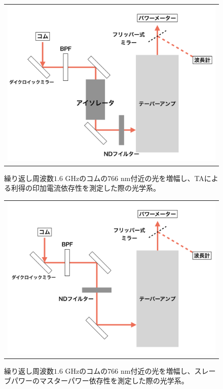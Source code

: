 \documentclass[uplatex, dvipdfmx, a4paper, report, papersize, 11pt]{jsbook}
\begin{document}
\begin{figure}[H]
  \centering
    \begin{tabular}{c}
      \begin{minipage}{1\hsize}
        \centering
          \includegraphics[keepaspectratio,  scale=0.35,  angle=0]
          {figures/chapter4/astro_amp_diagram_isolator.png}
          \caption{繰り返し周波数$1.6$ GHzのコムの$766$ nm付近の光を増幅し、TAによる利得の印加電流依存性を測定した際の光学系。}
          \label{astro_amp_diagram_isolator}
      \end{minipage}
    \end{tabular}
\end{figure}
\begin{figure}[H]
  \centering
    \begin{tabular}{c}
      \begin{minipage}{1\hsize}
        \centering
          \includegraphics[keepaspectratio,  scale=0.35,  angle=0]
          {figures/chapter4/760_astro_amp_diagram.png}
          \caption{繰り返し周波数$1.6$ GHzのコムの$766$ nm付近の光を増幅し、スレーブパワーのマスターパワー依存性を測定した際の光学系。}
          \label{760_astro_amp_diagram}
      \end{minipage}
    \end{tabular}
\end{figure}
\end{document}
